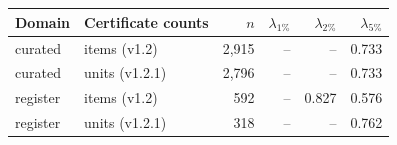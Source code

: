 \begin{tabular}{llrrrr}
\toprule
Domain & Certificate counts & $n$ & $\lambda_{1\%}$ & $\lambda_{2\%}$ & $\lambda_{5\%}$ \\
\midrule
curated & items (v1.2) & 2{,}915 & -- & -- & 0.733 \\
curated & units (v1.2.1) & 2{,}796 & -- & -- & 0.733 \\
register & items (v1.2) & 592 & -- & 0.827 & 0.576 \\
register & units (v1.2.1) & 318 & -- & -- & 0.762 \\
\bottomrule
\end{tabular}
